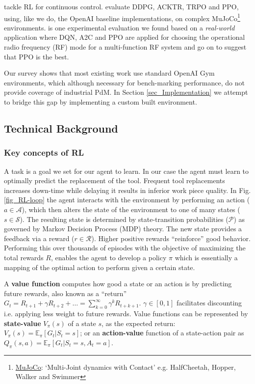 \documentclass[referee, sn-mathphys-num]{sn-jnl}
\begin{document}
	\cite{dulac2021, henderson2018deep} tackle RL for continuous control. \cite{henderson2018deep} evaluate DDPG, ACKTR, TRPO and PPO, using, like we do, the OpenAI baseline implementations, on complex MuJoCo\footnote{\href{https://mujoco.org/}{MuJoCo}: `Multi-Joint dynamics with Contact' e.g. HalfCheetah, Hopper, Walker and Swimmer} environments. \cite{ford2022cognitive} is one experimental evaluation we found based on a \textit{real-world} application where DQN, A2C and PPO are applied for choosing the operational radio frequency (RF) mode for a multi-function RF system and go on to suggest that PPO is the best.
	
	Our survey shows that most existing work use standard OpenAI Gym environments, which although necessary for bench-marking performance, do not provide coverage of industrial PdM. In Section {\ref{sec_Implementation}} we attempt to bridge this gap by implementing a custom built environment.
	
	\subsection{Technical Background}
	\subsubsection*{Key concepts of RL}
	A task is a goal we set for our agent to learn. In our case the agent must learn to optimally predict the replacement of the tool. Frequent tool replacements increases down-time while delaying it results in inferior work piece quality. In Fig. \ref{fig_RL-loop} the agent interacts with the environment by performing an action ($a \in \mathcal{A}$), which then alters the state of the environment to one of many states ($s \in \mathcal{S}$). The resulting state is determined by state-transition probabilities ($\mathcal{P}$) as governed by Markov Decision Process (MDP) theory. The new state provides a feedback via a reward ($r \in \mathcal{R}$). Higher positive rewards ``reinforce'' good behavior. Performing this over thousands of episodes with the objective of maximizing the total rewards $R$, enables the agent to develop a policy $\pi$ which is essentially a mapping of the optimal action to perform given a certain state.
	
	A \textbf{value function} computes how good a state or an action is by predicting future rewards, also known as a ``return'' $G_t = R_{t+1} + \gamma R_{t+2} + \dots = \sum_{k=0}^{\infty} \gamma^k R_{t+k+1}$. $\gamma \in [0, 1]$ facilitates discounting i.e. applying less weight to future rewards. Value functions can be represented by \textbf{state-value} $V_{\pi}(s)$ of a state $s$, as the expected return: $V_{\pi}(s) = \mathbb{E}_{\pi}[G_t \vert S_t = s]$; or an \textbf{action-value} function of a state-action pair as $Q_{\pi}(s, a) = \mathbb{E}_{\pi}[G_t \vert S_t = s, A_t = a]$.
	
\end{document}
